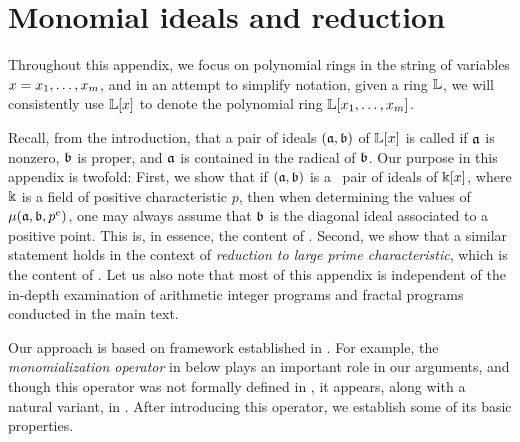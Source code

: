 \documentclass{amsart}
\begin{document}
\newpage
\appendix

\section{Monomial ideals and reduction}
\label{monomial-reduction: A}

Throughout this appendix, we focus on polynomial rings in the string of variables $x = x_1, \ldots, x_m$, and in an attempt to simplify notation,  given a ring $\mathbb{L}$, we will {consistently} use $\mathbb{L}[x]$ to denote the polynomial ring $\mathbb{L}[x_1, \ldots, x_m]$.

Recall, from {the introduction}, that a pair of ideals $(\mathfrak{a}, \mathfrak{b})$ of $\mathbb{L}[x]$ is called \emph{\compatible}
if $\mathfrak{a}$ is nonzero, $\mathfrak{b}$ is proper, and $\mathfrak{a}$ is contained in the radical of $\mathfrak{b}$.  
Our purpose in this appendix is twofold:  First, we show that if $(\mathfrak{a}, \mathfrak{b})$ is a \compatible\ pair of ideals of $\Bbbk[x]$, where $\Bbbk$ is a field of positive characteristic $p$, then when determining the values of $\mu(\mathfrak{a}, \mathfrak{b}, p^e)$, one may always assume that $\mathfrak{b}$ is the diagonal ideal associated to a positive point.   This is, in essence, the content of .  Second, we show that a similar statement holds in the context of \emph{reduction to large prime characteristic}, which is the content of .
Let us also note that most of this appendix is independent of the in-depth examination of arithmetic integer programs and fractal programs conducted in the main text. 

Our approach is based on framework established in \cite[Appendix]{budur+mustata+saito.roots_bs_polys_monomial}.  For example, the \emph{monomialization operator} in  below plays an important role in our arguments, and though this operator was not formally defined in \loccit, it appears, along with a natural variant, in \cite[Proposition 6.1 and Lemma 6.2]{budur+mustata+saito.roots_bs_polys_monomial}.  After introducing this operator, we establish some of its basic properties.
\end{document}
